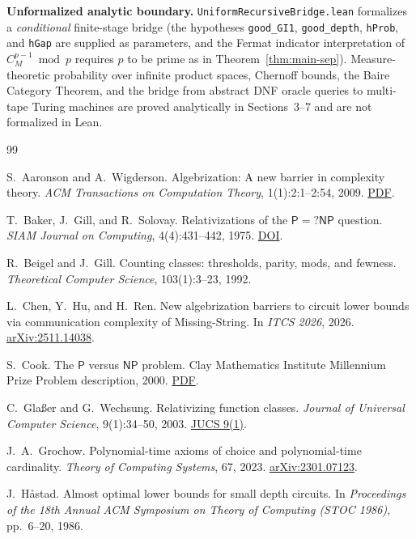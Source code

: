 \documentclass[11pt,a4paper]{article}
\theoremstyle{definition}
\theoremstyle{remark}
\newcommand{\Pcl}{\mathsf{P}}
\newcommand{\NP}{\mathsf{NP}}
\begin{document}
\textbf{Unformalized analytic boundary.} \texttt{UniformRecursiveBridge.lean} formalizes a \emph{conditional} finite-stage bridge (the hypotheses \texttt{good\_GI1}, \texttt{good\_depth}, \texttt{hProb}, and \texttt{hGap} are supplied as parameters, and the Fermat indicator interpretation of $C_M^{p-1} \bmod p$ requires $p$ to be prime as in Theorem~\ref{thm:main-sep}). Measure-theoretic probability over infinite product spaces, Chernoff bounds, the Baire Category Theorem, and the bridge from abstract DNF oracle queries to multi-tape Turing machines are proved analytically in Sections~3--7 and are not formalized in Lean.

\begin{thebibliography}{99}

S.~Aaronson and A.~Wigderson.
Algebrization: A new barrier in complexity theory.
\emph{ACM Transactions on Computation Theory}, 1(1):2:1--2:54, 2009.
\href{https://www.scottaaronson.com/papers/alg.pdf}{PDF}.

T.~Baker, J.~Gill, and R.~Solovay.
Relativizations of the $\Pcl = ?\NP$ question.
\emph{SIAM Journal on Computing}, 4(4):431--442, 1975.
\href{https://epubs.siam.org/doi/10.1137/0204037}{DOI}.

R.~Beigel and J.~Gill.
Counting classes: thresholds, parity, mods, and fewness.
\emph{Theoretical Computer Science}, 103(1):3--23, 1992.

L.~Chen, Y.~Hu, and H.~Ren.
New algebrization barriers to circuit lower bounds via communication complexity of Missing-String.
In \emph{ITCS 2026}, 2026.
\href{https://arxiv.org/abs/2511.14038}{arXiv:2511.14038}.

S.~Cook.
The $\Pcl$ versus $\NP$ problem.
Clay Mathematics Institute Millennium Prize Problem description, 2000.
\href{https://www.claymath.org/wp-content/uploads/2022/06/pvsnp.pdf}{PDF}.

C.~Gla\ss er and G.~Wechsung.
Relativizing function classes.
\emph{Journal of Universal Computer Science}, 9(1):34--50, 2003.
\href{https://lib.jucs.org/issue/4069/}{JUCS 9(1)}.

J.~A.~Grochow.
Polynomial-time axioms of choice and polynomial-time cardinality.
\emph{Theory of Computing Systems}, 67, 2023.
\href{https://arxiv.org/abs/2301.07123}{arXiv:2301.07123}.

J.~H\aa stad.
Almost optimal lower bounds for small depth circuits.
In \emph{Proceedings of the 18th Annual ACM Symposium on Theory of Computing (STOC 1986)}, pp.~6--20, 1986.


\end{thebibliography}
\end{document}
